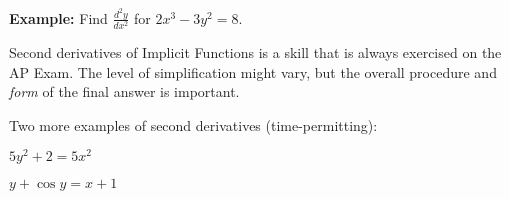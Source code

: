 \documentclass[addpoints, 12pt]{exam}
\begin{document}
\textbf{Example:} Find $\displaystyle\frac{d^2y}{dx^2}$ for $2x^3-3y^2=8$.

Second derivatives of Implicit Functions is a skill that is always exercised on the AP Exam. The level of simplification might vary, but the overall procedure and \textit{form} of the final answer is important.

\newpage

Two more examples of second derivatives (time-permitting):
\begin{questions}
    \question $\displaystyle 5y^2+2=5x^2$
    
    \question $y+\cos y=x+1$
\end{questions}

\newpage
{}
\end{document}
